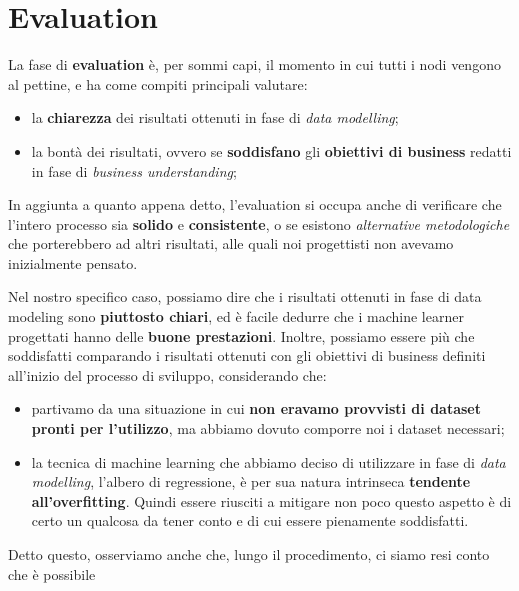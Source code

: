 \documentclass[a4paper, 11pt, oneside]{report}
\begin{document}
    \section{Evaluation}
            La fase di \textbf{evaluation} è, per sommi capi, il momento in cui tutti i nodi vengono al pettine,
            e ha come compiti principali valutare:
            \begin{itemize}
                \item la \textbf{chiarezza} dei risultati ottenuti in fase di \textit{data modelling};
                \item la bontà dei risultati, ovvero se \textbf{soddisfano} gli \textbf{obiettivi di business} redatti in
                fase di \textit{business understanding};
            \end{itemize}
            In aggiunta a quanto appena detto, l'evaluation si occupa anche di verificare che l'intero processo sia
            \textbf{solido} e \textbf{consistente}, o se esistono \textit{alternative metodologiche} che porterebbero ad altri risultati,
            alle quali noi progettisti non avevamo inizialmente pensato.
            \par \noindent Nel nostro specifico caso, possiamo dire che i risultati ottenuti in fase di data modeling sono
            \textbf{piuttosto chiari}, ed è facile dedurre che i machine learner progettati hanno delle \textbf{buone prestazioni}.
            Inoltre, possiamo essere più che soddisfatti comparando i risultati ottenuti con gli obiettivi di business
            definiti all'inizio del processo di sviluppo, considerando che:
            \begin{itemize}
                \item partivamo da una situazione in cui \textbf{non eravamo provvisti di dataset pronti per l'utilizzo}, ma abbiamo
                dovuto comporre noi i dataset necessari;
                \item la tecnica di machine learning che abbiamo deciso di utilizzare in fase di \textit{data modelling},
                l'albero di regressione, è per sua natura intrinseca \textbf{tendente all'overfitting}.
                Quindi essere riusciti a mitigare non poco questo aspetto è di certo un qualcosa da tener conto e di cui essere
                pienamente soddisfatti.
            \end{itemize}
            \par \noindent Detto questo, osserviamo anche che, lungo il procedimento, ci siamo resi conto che è possibile
\end{document}
